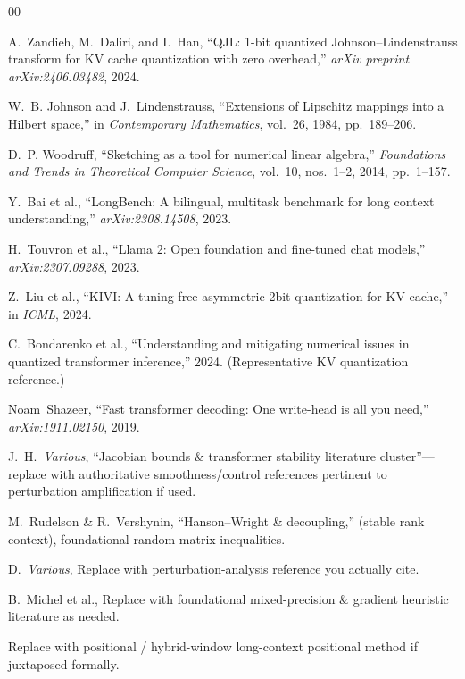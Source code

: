 \documentclass[conference]{IEEEtran}
\begin{document}
\begin{thebibliography}{00}

A.~Zandieh, M.~Daliri, and I.~Han, ``QJL: 1-bit quantized Johnson--Lindenstrauss transform for KV cache quantization with zero overhead,'' \emph{arXiv preprint arXiv:2406.03482}, 2024.

W.~B. Johnson and J.~Lindenstrauss, ``Extensions of Lipschitz mappings into a Hilbert space,'' in \emph{Contemporary Mathematics}, vol.~26, 1984, pp.~189--206.

D.~P. Woodruff, ``Sketching as a tool for numerical linear algebra,'' \emph{Foundations and Trends in Theoretical Computer Science}, vol.~10, nos.~1--2, 2014, pp.~1--157.

Y.~Bai et al., ``LongBench: A bilingual, multitask benchmark for long context understanding,'' \emph{arXiv:2308.14508}, 2023.

H.~Touvron et al., ``Llama 2: Open foundation and fine-tuned chat models,'' \emph{arXiv:2307.09288}, 2023.

Z.~Liu et al., ``KIVI: A tuning-free asymmetric 2bit quantization for KV cache,'' in \emph{ICML}, 2024.

C.~Bondarenko et al., ``Understanding and mitigating numerical issues in quantized transformer inference,'' 2024. (Representative KV quantization reference.)

Noam~Shazeer, ``Fast transformer decoding: One write-head is all you need,'' \emph{arXiv:1911.02150}, 2019.

J.~H.~\emph{Various}, ``Jacobian bounds \& transformer stability literature cluster''—replace with authoritative smoothness/control references pertinent to perturbation amplification if used.

M.~Rudelson \& R.~Vershynin, ``Hanson--Wright \& decoupling,'' (stable rank context), foundational random matrix inequalities.

D.~\emph{Various}, Replace with perturbation-analysis reference you actually cite.

B.~Michel et al., Replace with foundational mixed-precision \& gradient heuristic literature as needed.

Replace with positional / hybrid-window long-context positional method if juxtaposed formally.


\end{thebibliography}
\end{document}
